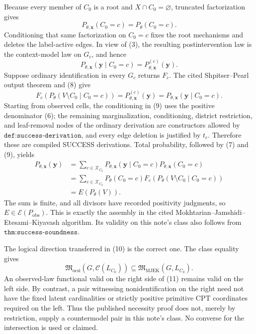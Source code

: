 Because every member of \(C_0\) is a root and \(X\cap C_0=\varnothing\), truncated factorization gives
\[
P_{\theta,\mathbf x}(C_0=c)=P_\theta(C_0=c).
\tag{7}
\]
Conditioning that same factorization on \(C_0=c\) fixes the root mechanisms and deletes the label-active edges. In view of (3), the resulting postintervention law is the context-model law on \(G_c\), and hence
\[
P_{\theta,\mathbf x}(\mathbf y\mid C_0=c)
=P^{(c)}_{\theta,\mathbf x}(\mathbf y).
\tag{8}
\]
Suppose ordinary identification in every \(G_c\) returns \(F_c\). The cited Shpitser--Pearl output theorem and (8) give
\[
F_c\!\left(P_\theta(V\setminus C_0\mid C_0=c)\right)
=P^{(c)}_{\theta,\mathbf x}(\mathbf y)
=P_{\theta,\mathbf x}(\mathbf y\mid C_0=c).
\tag{9}
\]
Starting from observed cells, the conditioning in (9) uses the positive denominator (6); the remaining marginalization, conditioning, district restriction, and leaf-removal nodes of the ordinary derivation are constructors allowed by \(\texttt{def:success-derivation}\), and every edge deletion is justified by \(t_c\). Therefore these are compiled SUCCESS derivations. Total probability, followed by (7) and (9), yields
\[
\begin{aligned}
P_{\theta,\mathbf x}(\mathbf y)
&=\sum_{c\in\mathcal X_{C_0}}
  P_{\theta,\mathbf x}(\mathbf y\mid C_0=c)
  P_{\theta,\mathbf x}(C_0=c)\\
&=\sum_{c\in\mathcal X_{C_0}}
  P_\theta(C_0=c)
  F_c\!\left(P_\theta(V\setminus C_0\mid C_0=c)\right)\\
&=E(P_\theta(V)).
\end{aligned}
\tag{10}
\]
The sum is finite, and all divisors have recorded positivity judgments, so \(E\in\mathscr E(P_{\mathrm{obs}})\). This is exactly the assembly in the cited Mokhtarian--Jamshidi--Etesami--Kiyavash algorithm. Its validity on this note's class also follows from \(\texttt{thm:success-soundness}\).

The logical direction transferred in (10) is the correct one. The class equality gives
\[
\mathfrak M_{\mathrm{ocsi}}\!\left(G,\mathcal C(L_{C_0})\right)
\subseteq \mathfrak M_{\mathrm{MJEK}}(G,L_{C_0}).
\tag{11}
\]
An observed-law functional valid on the right side of (11) remains valid on the left side. By contrast, a pair witnessing nonidentification on the right need not have the fixed latent cardinalities or strictly positive primitive CPT coordinates required on the left. Thus the published necessity proof does not, merely by restriction, supply a countermodel pair in this note's class. No converse for the intersection is used or claimed.

